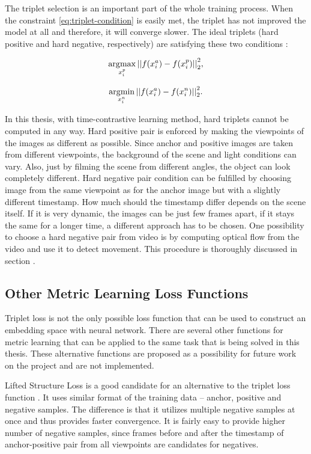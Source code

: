 The triplet selection is an important part of the whole training process. When the constraint \ref{eq:triplet-condition} is easily met, the triplet has not improved the model at all and therefore, it will converge slower. The ideal triplets (hard positive and hard negative, respectively) are satisfying these two conditions \cite{facenet-triplet-loss}:

\begin{equation}
    \label{eq:triplet-sel1}
    \operatorname*{arg\!\max}_{x^{p}_{i}}{{|| f(x^{a}_{i}) - f(x^{p}_{i}) ||}^{2}_{2}},
\end{equation}

\begin{equation}
    \label{eq:triplet-sel2}
    \operatorname*{arg\!\min}_{x^{n}_{i}}{{|| f(x^{a}_{i}) - f(x^{n}_{i}) ||}^{2}_{2}}.
\end{equation}

In this thesis, with time-contrastive learning method, hard triplets cannot be computed in any way. Hard positive pair is enforced by making the viewpoints of the images as different as possible. Since anchor and positive images are taken from different viewpoints, the background of the scene and light conditions can vary. Also, just by filming the scene from different angles, the object can look completely different. Hard negative pair condition can be fulfilled by choosing image from the same viewpoint as for the anchor image but with a slightly different timestamp. How much should the timestamp differ depends on the scene itself. If it is very dynamic, the images can be just few frames apart, if it stays the same for a longer time, a different approach has to be chosen. One possibility to choose a hard negative pair from video is by computing optical flow from the video and use it to detect movement. This procedure is thoroughly discussed in section .

\subsection{Other Metric Learning Loss Functions}

Triplet loss is not the only possible loss function that can be used to construct an embedding space with neural network. There are several other functions for metric learning that can be applied to the same task that is being solved in this thesis. These alternative functions are proposed as a possibility for future work on the project and are not implemented.

Lifted Structure Loss is a good candidate for an alternative to the triplet loss function \cite{lifted-structure}. It uses similar format of the training data -- anchor, positive and negative samples. The difference is that it utilizes multiple negative samples at once and thus provides faster convergence. It is fairly easy to provide higher number of negative samples, since frames before and after the timestamp of anchor-positive pair from all viewpoints are candidates for negatives.

